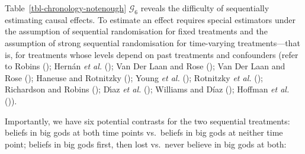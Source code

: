 \documentclass[
  single column]{article}
\begin{document}
Table~\ref{tbl-chronology-notenough} \(\mathcal{G}_6\) reveals the
difficulty of sequentially estimating causal effects. To estimate an
effect requires special estimators under the assumption of sequential
randomisation for fixed treatments and the assumption of strong
sequential randomisation for time-varying treatments---that is, for
treatments whose levels depend on past treatments and confounders (refer
to Robins (); Hernán \emph{et al.}
(); Van Der Laan and Rose
(); Van Der Laan and Rose
(); Haneuse and Rotnitzky
(); Young \emph{et al.}
(); Rotnitzky \emph{et al.}
(); Richardson and Robins
(); Dı́az \emph{et al.}
(); Williams and Díaz
(); Hoffman \emph{et al.}
()).

Importantly, we have six potential contrasts for the two sequential
treatments: beliefs in big gods at both time points vs.~beliefs in big
gods at neither time point; beliefs in big gods first, then lost
vs.~never believe in big gods at both:
\end{document}
